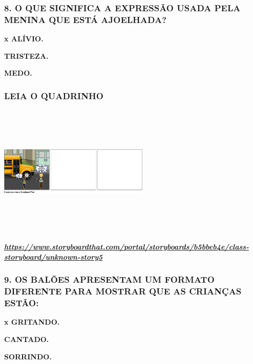 \subsubsection{8. O QUE SIGNIFICA A EXPRESSÃO USADA PELA MENINA QUE ESTÁ
AJOELHADA?}\label{o-que-significa-a-expressuxe3o-usada-pela-menina-que-estuxe1-ajoelhada}

\textbf{x ALÍVIO.}

\textbf{TRISTEZA.}

\textbf{MEDO. }

\subsubsection{LEIA O QUADRINHO}\label{leia-o-quadrinho}

\includegraphics[width=2.81319in,height=2.49306in]{media/image176.png}

\href{https://www.storyboardthat.com/portal/storyboards/b5bbeb4e/class-storyboard/unknown-story5}{\textbf{\emph{https://www.storyboardthat.com/portal/storyboards/b5bbeb4e/class-storyboard/unknown-story5}}}

\subsubsection{9. OS BALÕES APRESENTAM UM FORMATO DIFERENTE PARA MOSTRAR QUE AS
CRIANÇAS
ESTÃO:}\label{os-baluxf5es-tem-um-formato-diferente-para-mostrar-que-as-crianuxe7as-estuxe3o}

\textbf{x GRITANDO. }

\textbf{CANTADO.}

\textbf{SORRINDO.}

